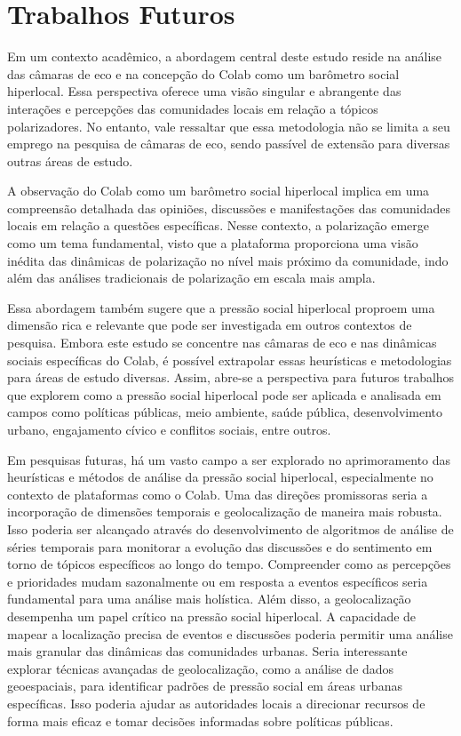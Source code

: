 \section{Trabalhos Futuros}

Em um contexto acadêmico, a abordagem central deste estudo reside na análise das câmaras de eco e na concepção do Colab como um barômetro social hiperlocal. Essa perspectiva oferece uma visão singular e abrangente das interações e percepções das comunidades locais em relação a tópicos polarizadores. No entanto, vale ressaltar que essa metodologia não se limita a seu emprego na pesquisa de câmaras de eco, sendo passível de extensão para diversas outras áreas de estudo.

A observação do Colab como um barômetro social hiperlocal implica em uma compreensão detalhada das opiniões, discussões e manifestações das comunidades locais em relação a questões específicas. Nesse contexto, a polarização emerge como um tema fundamental, visto que a plataforma proporciona uma visão inédita das dinâmicas de polarização no nível mais próximo da comunidade, indo além das análises tradicionais de polarização em escala mais ampla.

Essa abordagem também sugere que a pressão social hiperlocal proproem uma dimensão rica e relevante que pode ser investigada em outros contextos de pesquisa. Embora este estudo se concentre nas câmaras de eco e nas dinâmicas sociais específicas do Colab, é possível extrapolar essas heurísticas e metodologias para áreas de estudo diversas. Assim, abre-se a perspectiva para futuros trabalhos que explorem como a pressão social hiperlocal pode ser aplicada e analisada em campos como políticas públicas, meio ambiente, saúde pública, desenvolvimento urbano, engajamento cívico e conflitos sociais, entre outros.

Em pesquisas futuras, há um vasto campo a ser explorado no aprimoramento das heurísticas e métodos de análise da pressão social hiperlocal, especialmente no contexto de plataformas como o Colab. Uma das direções promissoras seria a incorporação de dimensões temporais e geolocalização de maneira mais robusta. Isso poderia ser alcançado através do desenvolvimento de algoritmos de análise de séries temporais para monitorar a evolução das discussões e do sentimento em torno de tópicos específicos ao longo do tempo. Compreender como as percepções e prioridades mudam sazonalmente ou em resposta a eventos específicos seria fundamental para uma análise mais holística. Além disso, a geolocalização desempenha um papel crítico na pressão social hiperlocal. A capacidade de mapear a localização precisa de eventos e discussões poderia permitir uma análise mais granular das dinâmicas das comunidades urbanas. Seria interessante explorar técnicas avançadas de geolocalização, como a análise de dados geoespaciais, para identificar padrões de pressão social em áreas urbanas específicas. Isso poderia ajudar as autoridades locais a direcionar recursos de forma mais eficaz e tomar decisões informadas sobre políticas públicas.

